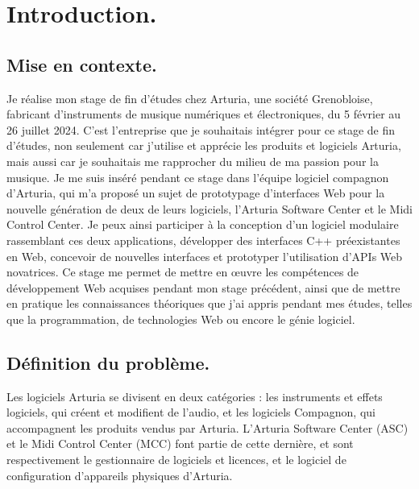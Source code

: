 \documentclass[francais]{rapportPFE}  %
\begin{document}



     
     
     
\section{Introduction.}

\subsection{Mise en contexte.}
Je réalise mon stage de fin d'études chez Arturia, une société Grenobloise, fabricant d'instruments de musique numériques et électroniques, du 5 février au 26 juillet 2024. C'est l'entreprise que je souhaitais intégrer pour ce stage de fin d'études, non seulement car j'utilise et apprécie les produits et logiciels Arturia, mais aussi car je souhaitais me rapprocher du milieu de ma passion pour la musique. 
Je me suis inséré pendant ce stage dans l'équipe logiciel compagnon d'Arturia, qui m'a proposé un sujet de prototypage d'interfaces Web pour la nouvelle génération de deux de leurs logiciels, l'Arturia Software Center et le Midi Control Center. Je peux ainsi participer à la conception d'un logiciel modulaire rassemblant ces deux applications, développer des interfaces C++ préexistantes en Web, concevoir de nouvelles interfaces et prototyper l'utilisation d'APIs Web novatrices. Ce stage me permet de mettre en œuvre les compétences de développement Web acquises pendant mon stage précédent, ainsi que de mettre en pratique les connaissances théoriques que j'ai appris pendant mes études, telles que la programmation, de technologies Web ou encore le génie logiciel.
\subsection{Définition du problème.}

Les logiciels Arturia se divisent en deux catégories : les instruments et effets logiciels, qui créent et modifient de l'audio, et les logiciels Compagnon, qui accompagnent les produits vendus par Arturia.
L'Arturia Software Center (ASC) et le Midi Control Center (MCC) font partie de cette dernière, et sont respectivement le gestionnaire de logiciels et licences, et le logiciel de configuration d'appareils physiques d'Arturia.
\end{document}
